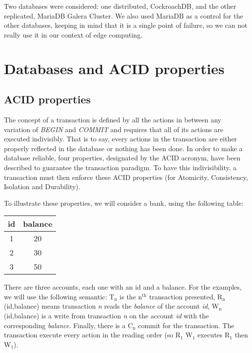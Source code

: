 Two databases were considered: one distributed, CockroachDB, and the other replicated, MariaDB Galera Cluster. We also used MariaDB as a control for the other databases, keeping in mind that it is a single point of failure, so we can not really use it in our context of edge computing.


\section{Databases and ACID properties}

\subsection{ACID properties}
The concept of a transaction is defined by all the actions in between any variation of \emph{BEGIN} and \emph{COMMIT} and requires that all of its actions are executed indivisibly. That is to say, every actions in the transaction are either properly reflected in the database or nothing has been done\cite{DBLP:journals/csur/HarderR83}. In order to make a database reliable, four properties, designated by the ACID acronym, have been described to guarantee the transaction paradigm. To have this indivisibility, a transaction must then enforce these ACID properties (for Atomicity, Consistency, Isolation and Durability).

To illustrate these properties, we will consider a bank, using the following table:

\begin{center}
\begin{tabular}{c | c}
id & balance\\
\hline
1 & 20\\
2 & 30\\
3 & 50\\
\end{tabular}
\end{center}

There are three accounts, each one with an id and a balance. For the examples, we will use the following semantic: T$_{\text{n}}$ is the n$^{\text{th}}$ transaction presented, R$_{\text{n}}$(id,balance) means transaction \emph{n} reads the \emph{balance} of the account \emph{id}, W$_{\text{n}}$(id,balance) is a write from transaction \emph{n} on the account \emph{id} with the corresponding \emph{balance}. Finally, there is a C$_{\text{n}}$ commit for the transaction. The transaction execute every action in the reading order (so R$_{\text{1}}$ W$_{\text{1}}$ executes R$_{\text{1}}$ then W$_{\text{1}}$).


